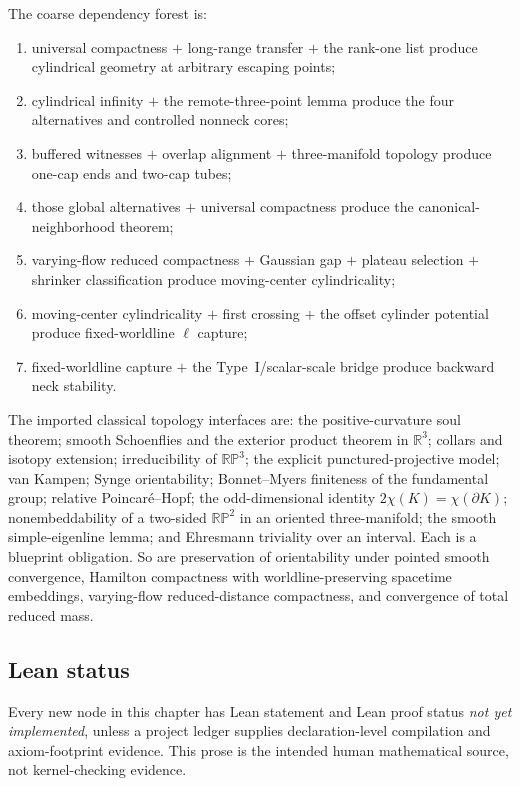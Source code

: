 \documentclass[10pt]{coll-l}
\newcommand{\R}{\mathbb{R}}
\theoremstyle{definition}
\theoremstyle{remark}
\numberwithin{section}{chapter}
\numberwithin{equation}{chapter}
\begin{document}
The coarse dependency forest is:
\begin{enumerate}
\item universal compactness $+$ long-range transfer $+$ the rank-one list
      produce cylindrical geometry at arbitrary escaping points;
\item cylindrical infinity $+$ the remote-three-point lemma produce the
      four alternatives and controlled nonneck cores;
\item buffered witnesses $+$ overlap alignment $+$ three-manifold topology
      produce one-cap ends and two-cap tubes;
\item those global alternatives $+$ universal compactness produce the
      canonical-neighborhood theorem;
\item varying-flow reduced compactness $+$ Gaussian gap $+$ plateau
      selection $+$ shrinker classification produce moving-center
      cylindricality;
\item moving-center cylindricality $+$ first crossing $+$ the offset
      cylinder potential produce fixed-worldline $\ell$ capture;
\item fixed-worldline capture $+$ the Type~I/scalar-scale bridge produce
      backward neck stability.
\end{enumerate}

The imported classical topology interfaces are: the positive-curvature
soul theorem; smooth Schoenflies and the exterior product theorem in
$\R^3$; collars and isotopy extension;
irreducibility of $\mathbb{RP}^3$; the explicit punctured-projective model;
van Kampen; Synge orientability; Bonnet--Myers finiteness of the
fundamental group; relative Poincar\'e--Hopf; the odd-dimensional identity
$2\chi(K)=\chi(\partial K)$; nonembeddability of a two-sided
$\mathbb{RP}^2$ in an oriented three-manifold; the smooth simple-eigenline
lemma; and Ehresmann triviality over an interval.  Each is a blueprint
obligation.  So are preservation of orientability under pointed smooth
convergence, Hamilton compactness with worldline-preserving spacetime
embeddings, varying-flow reduced-distance compactness, and convergence of
total reduced mass.

\subsection*{Lean status}

Every new node in this chapter has Lean statement and Lean proof status
\emph{not yet implemented}, unless a project ledger supplies
declaration-level compilation and axiom-footprint evidence.  This prose is
the intended human mathematical source, not kernel-checking evidence.
\end{document}
